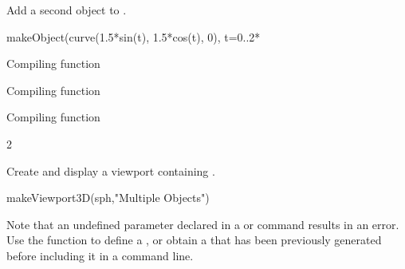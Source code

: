 \begin{xtc}
\begin{xtccomment}
Add a second object to .
\end{xtccomment}
\begin{spadsrc}
makeObject(curve(1.5*sin(t), 1.5*cos(t), 0), t=0..2*%
\end{spadsrc}
\begin{MessageOutput}
   Compiling function %
\end{MessageOutput}
\begin{MessageOutput}
   Compiling function %
\end{MessageOutput}
\begin{MessageOutput}
   Compiling function %
\end{MessageOutput}
\begin{TeXOutput}
\begin{fricasmath}{3}
2%
\end{fricasmath}
\end{TeXOutput}
\end{xtc}
\begin{noOutputXtc}
\begin{xtccomment}
Create and display a viewport
containing .
\end{xtccomment}
\begin{spadsrc}
makeViewport3D(sph,"Multiple Objects") 
\end{spadsrc}
\begin{TeXOutput}
\begin{fricasmath}{4}
%
\end{fricasmath}
\end{TeXOutput}
\end{noOutputXtc}

Note that an undefined  parameter declared in a
 or  command results in an error.
Use the  function to define a
, or obtain a  that has been
previously generated before including it in a command line.


